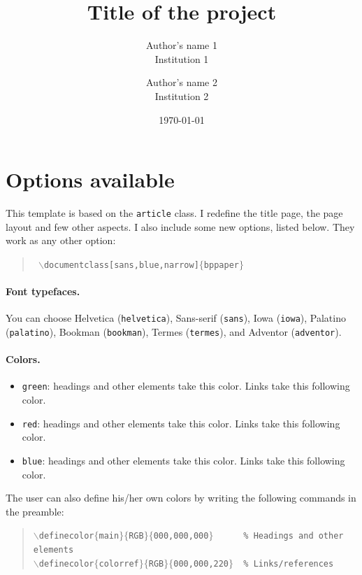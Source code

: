 \documentclass[12pt]{bppaper}
\title{Title of the project}
\author{Author's name 1\\Institution 1 \and Author's name 2\\Institution 2}
\date{\today}
\begin{document}
\maketitle
\newpage


\section{Options available}

This template is based on the \texttt{article} class. I redefine the title page, the page layout and few other aspects. I also include some new options, listed below. They work as any other option:
\begin{quote}
\texttt{
$\backslash$documentclass[sans,blue,narrow]$\{$bppaper$\}$
}
\end{quote}

\paragraph{Font typefaces.} You can choose Helvetica (\texttt{helvetica}), Sans-serif (\texttt{sans}), Iowa (\texttt{iowa}), Palatino (\texttt{palatino}), Bookman (\texttt{bookman}), Termes (\texttt{termes}), and Adventor (\texttt{adventor}).

\paragraph{Colors.}
\begin{itemize}
\item \texttt{green}: {\color{green0}headings and other elements take this color}. {\color{green1}Links take this following color}.
\item \texttt{red}: {\color{red0}headings and other elements take this color}. {\color{red1}Links take this following color}.
\item \texttt{blue}: {\color{blue0}headings and other elements take this color}. {\color{blue1}Links take this following color}.
\end{itemize}
The user can also define his/her own colors by writing the following commands in the preamble:
\begin{quote}
\texttt{$\backslash$definecolor$\{$main$\}\{$RGB$\}\{$000,000,000$\}$ \ \ \ \ \ \% Headings and other elements}\\
\texttt{$\backslash$definecolor$\{$colorref$\}\{$RGB$\}\{$000,000,220$\}$ \ \% Links/references}
\end{quote}
\end{document}
